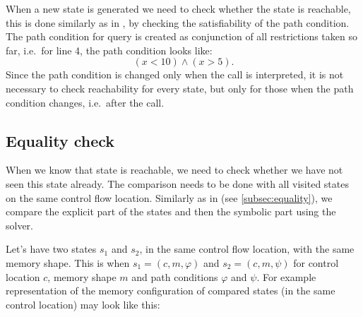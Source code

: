 When a new state is generated we need to check whether the state is reachable,
this is done similarly as in \SymDIVINE, by checking the satisfiability of the
path condition. The path condition for \SMT query is created as conjunction of
all restrictions taken so far, i.e.~for line 4, the path condition looks like:
\[ (x < 10) \wedge (x > 5).\]
Since the path condition is changed only when the  call is
interpreted, it is not necessary to check reachability for every state, but only
for those when the path condition changes, i.e.~after the  call.

\subsection{Equality check}

When we know that state is reachable, we need to check whether we have not seen
this state already. The comparison needs to be done with all visited states on
the same control flow location. Similarly as in \SymDIVINE (see
\autoref{subsec:equality}), we compare the explicit part of the
states and then the symbolic part using the \SMT solver.

Let's have two states $s_1$ and $s_2$, in the same control flow location, with
the same memory shape. This is when $s_1 = (c, m, \varphi)$ and $s_2 = (c,
m, \psi)$ for control location $c$, memory shape $m$ and path conditions $\varphi$ and $\psi$.
For example representation of the memory configuration of compared states (in
the same control location) may look like this:

